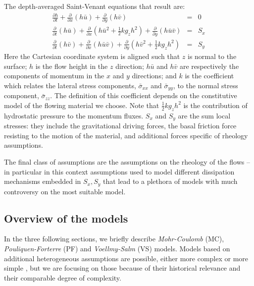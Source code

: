 \documentclass{article}
\begin{document}
The depth-averaged Saint-Venant equations that result are:
\begin{eqnarray}
\label{eq:D_A}
\frac{\partial h}{\partial t} +
\frac{\partial}{\partial x}(h \bar{u}) +
\frac{\partial}{\partial y}(h\bar{v}) &=& 0 \nonumber \\
\frac{\partial}{\partial t} (h\bar{u}) +
\frac{\partial}{\partial x}\left(h\bar{u}^2 + \frac{1}{2}k g_{z}h^2\right) + \frac{\partial}{\partial y}(h\bar{u}\bar{v}) &=& S_{x}\\
\frac{\partial}{\partial t} (h\bar{v}) +
\frac{\partial}{\partial x}(h\bar{u}\bar{v}) +
\frac{\partial}{\partial y}\left(h\bar{v}^2 + \frac{1}{2}k g_{z}h^2\right) &=& S_{y} \nonumber
\end{eqnarray}
Here the Cartesian coordinate system is aligned such that $z$ is normal to the surface; $h$ is the flow height in the $z$ direction; $h\bar{u}$ and $h\bar{v}$ are respectively the components of momentum in the $x$ and $y$ directions; and $k$ is the coefficient which relates the lateral stress components, $\bar{\sigma}_{xx}$ and $\bar{\sigma}_{yy}$, to the normal stress component, $\bar{\sigma}_{zz}$. The definition of this coefficient depends on the constitutive model of the flowing material we choose. Note that $\frac{1}{2} k g_z h^2$ is the contribution of hydrostatic pressure to the momentum fluxes. $S_x$ and $S_y$ are the sum local stresses: they include the gravitational driving forces, the basal friction force resisting to the motion of the material, and additional forces specific of rheology assumptions.

The final class of assumptions are the assumptions on the rheology of the flows -- in particular in this context assumptions used to model different dissipation mechanisms embedded in $S_x, S_y$ that lead to a plethora of models with much controversy on the most suitable model.

\subsection{Overview of the models}\label{subsec:Models}
In the three following sections, we briefly describe \emph{Mohr-Coulomb} (MC), \emph{Pouliquen-Forterre} (PF) and \emph{Voellmy-Salm} (VS) models. Models based on additional heterogeneous assumptions are possible, either more complex \citep{PitmanLe2005,Iverson2014} or more simple \citep{DadeHuppert1998}, but we are focusing on those because of their historical relevance and their comparable degree of complexity.
\end{document}
